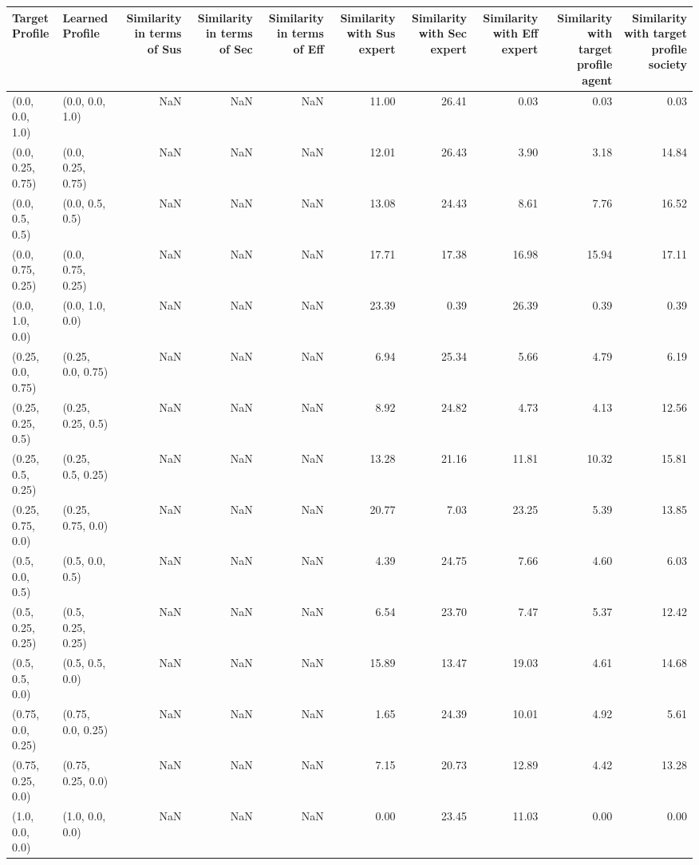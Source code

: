 \begin{tabular}{llrrrrrrrr}
\toprule
Target Profile & Learned Profile & Similarity in terms of Sus & Similarity in terms of Sec & Similarity in terms of Eff & Similarity with Sus expert & Similarity with Sec expert & Similarity with Eff expert & Similarity with target profile agent & Similarity with target profile society \\
\midrule
(0.0, 0.0, 1.0) & (0.0, 0.0, 1.0) & NaN & NaN & NaN & 11.00 & 26.41 & 0.03 & 0.03 & 0.03 \\
(0.0, 0.25, 0.75) & (0.0, 0.25, 0.75) & NaN & NaN & NaN & 12.01 & 26.43 & 3.90 & 3.18 & 14.84 \\
(0.0, 0.5, 0.5) & (0.0, 0.5, 0.5) & NaN & NaN & NaN & 13.08 & 24.43 & 8.61 & 7.76 & 16.52 \\
(0.0, 0.75, 0.25) & (0.0, 0.75, 0.25) & NaN & NaN & NaN & 17.71 & 17.38 & 16.98 & 15.94 & 17.11 \\
(0.0, 1.0, 0.0) & (0.0, 1.0, 0.0) & NaN & NaN & NaN & 23.39 & 0.39 & 26.39 & 0.39 & 0.39 \\
(0.25, 0.0, 0.75) & (0.25, 0.0, 0.75) & NaN & NaN & NaN & 6.94 & 25.34 & 5.66 & 4.79 & 6.19 \\
(0.25, 0.25, 0.5) & (0.25, 0.25, 0.5) & NaN & NaN & NaN & 8.92 & 24.82 & 4.73 & 4.13 & 12.56 \\
(0.25, 0.5, 0.25) & (0.25, 0.5, 0.25) & NaN & NaN & NaN & 13.28 & 21.16 & 11.81 & 10.32 & 15.81 \\
(0.25, 0.75, 0.0) & (0.25, 0.75, 0.0) & NaN & NaN & NaN & 20.77 & 7.03 & 23.25 & 5.39 & 13.85 \\
(0.5, 0.0, 0.5) & (0.5, 0.0, 0.5) & NaN & NaN & NaN & 4.39 & 24.75 & 7.66 & 4.60 & 6.03 \\
(0.5, 0.25, 0.25) & (0.5, 0.25, 0.25) & NaN & NaN & NaN & 6.54 & 23.70 & 7.47 & 5.37 & 12.42 \\
(0.5, 0.5, 0.0) & (0.5, 0.5, 0.0) & NaN & NaN & NaN & 15.89 & 13.47 & 19.03 & 4.61 & 14.68 \\
(0.75, 0.0, 0.25) & (0.75, 0.0, 0.25) & NaN & NaN & NaN & 1.65 & 24.39 & 10.01 & 4.92 & 5.61 \\
(0.75, 0.25, 0.0) & (0.75, 0.25, 0.0) & NaN & NaN & NaN & 7.15 & 20.73 & 12.89 & 4.42 & 13.28 \\
(1.0, 0.0, 0.0) & (1.0, 0.0, 0.0) & NaN & NaN & NaN & 0.00 & 23.45 & 11.03 & 0.00 & 0.00 \\
\bottomrule
\end{tabular}
